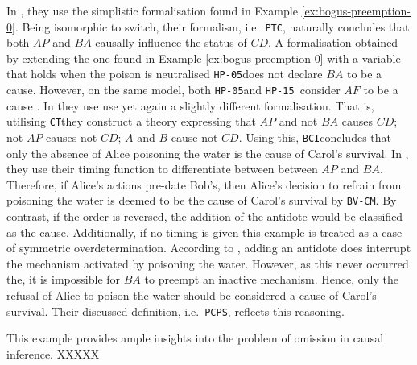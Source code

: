 \documentclass[11pt,a4paper]{book}
\theoremstyle{definition}
\theoremstyle{definition}
\newtheorem{example}{Example}[section]
\theoremstyle{definition}
\theoremstyle{remark}
\newcommand{\hpu}{\texttt{HP-05}}
\newcommand{\ptc}{\texttt{PTC}}
\newcommand{\hpm}{\texttt{HP-15 }}
\newcommand{\bvcm}{\texttt{BV-CM}}
\newcommand{\bci}{\texttt{BCI}}
\newcommand{\pcps}{\texttt{PCPS}}
\newcommand{\ct}{\texttt{CT}}
\begin{document}
In \parencite{weslake2015partial}, they use the simplistic formalisation found in Example \ref{ex:bogus-preemption-0}. 
Being isomorphic to switch, their formalism, i.e.\ \ptc,  naturally concludes that both $AP$ and $BA$ causally influence the status of $CD$.
A formalisation obtained by extending the one found in Example \ref{ex:bogus-preemption-0} with a variable that holds when the poison is neutralised \hpu does not declare $BA$ to be a cause.
However, on the same model, both \hpu and \hpm  consider $AF$ to be a cause \parencite[p.~88]{halpern2016actual}.
In \parencite{bochman2018actual} they use use yet again a slightly different formalisation.
That is, utilising \ct they construct a theory expressing that $AP$ and not $BA$ causes $CD$; not $AP$ causes not $CD$;
$A$ and $B$ cause not $CD$. Using this, \bci concludes that only the absence of Alice poisoning the water is the cause of Carol's survival. In \parencite{beckers2018principled}, they use their timing function to differentiate between between $AP$ and $BA$. Therefore, if Alice's actions pre-date Bob's, then Alice's decision to refrain from poisoning the water is deemed to be the cause of Carol's survival by \bvcm. By contrast, if the order is reversed, the addition of the antidote would be classified as the cause. Additionally, if no timing is given this example is treated as a case of symmetric overdetermination.
According to \parencite{denecker2019explaining}, adding an antidote does interrupt the mechanism activated by poisoning the water. However, as this never occurred the, it is impossible for $BA$ to preempt an inactive mechanism. 
Hence, only the refusal of Alice to poison the water should be considered a cause of Carol's survival.
Their discussed definition, i.e.\ \pcps, reflects this reasoning.


This example provides ample insights into the problem of omission in causal inference. XXXXX




%
%
%  
%  
%	
\end{document}
